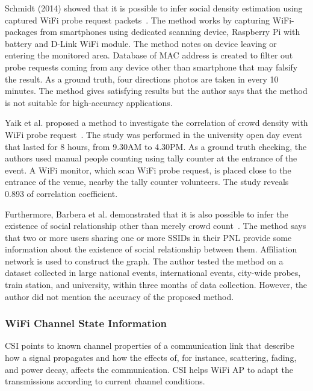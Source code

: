 	Schmidt (2014) showed that it is possible to infer social density estimation using captured WiFi probe request packets~\cite{thesis057}. The method works by capturing WiFi-packages from smartphones using dedicated scanning device, Raspberry Pi with battery and D-Link WiFi module. The method notes on device leaving or entering the monitored area. Database of \ac{MAC} address is created to filter out probe requests coming from any device other than smartphone that may falsify the result. As a ground truth, four directions photos are taken in every 10 minutes. The method gives satisfying results but the author says that the method is not suitable for high-accuracy applications.
	
	Yaik et al. proposed a method to investigate the correlation of crowd density with WiFi probe request~\cite{thesis047}. The study was performed in the university open day event that lasted for 8 hours, from 9.30AM to 4.30PM. As a ground truth checking, the authors used manual people counting using tally counter at the entrance of the event. A WiFi monitor, which scan WiFi probe request, is placed close to the entrance of the venue, nearby the tally counter volunteers. The study reveals 0.893 of correlation coefficient.

	Furthermore, Barbera et al. demonstrated that it is also possible to infer the existence of social relationship other than merely crowd count~\cite{thesis014}. The method says that two or more users sharing one or more \ac{SSID}s in their \ac{PNL} provide some information about the existence of social relationship between them. Affiliation network is used to construct the graph. The author tested the method on a dataset collected in large national events, international events, city-wide probes, train station, and university, within three months of data collection. However, the author did not mention the accuracy of the proposed method.

	

	
	\subsubsection{WiFi Channel State Information} %
	\label{ssub:wifi_channel_state_information}
	\ac{CSI} points to known channel properties of a communication link that describe how a signal propagates and how the effects of, for instance, scattering, fading, and power decay, affects the communication. \ac{CSI} helps WiFi \ac{AP} to adapt the transmissions according to current channel conditions.

